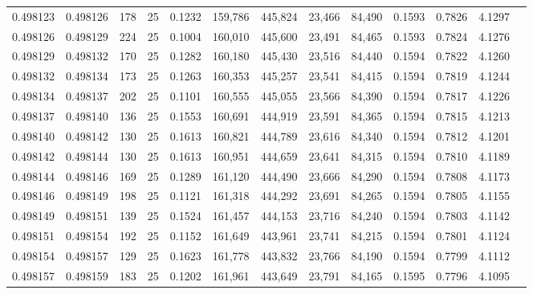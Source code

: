 \begin{tabular}{rrrrrrrrrrrrr}
0.498123 & 0.498126 & 178 &  25 &                                     0.1232 & 159,786 & 445,824 &  23,466 &  84,490 & 0.1593 & 0.7826 & 4.1297 \\
0.498126 & 0.498129 & 224 &  25 &                                     0.1004 & 160,010 & 445,600 &  23,491 &  84,465 & 0.1593 & 0.7824 & 4.1276 \\
0.498129 & 0.498132 & 170 &  25 &                                     0.1282 & 160,180 & 445,430 &  23,516 &  84,440 & 0.1594 & 0.7822 & 4.1260 \\
0.498132 & 0.498134 & 173 &  25 &                                     0.1263 & 160,353 & 445,257 &  23,541 &  84,415 & 0.1594 & 0.7819 & 4.1244 \\
0.498134 & 0.498137 & 202 &  25 &                                     0.1101 & 160,555 & 445,055 &  23,566 &  84,390 & 0.1594 & 0.7817 & 4.1226 \\
0.498137 & 0.498140 & 136 &  25 &                                     0.1553 & 160,691 & 444,919 &  23,591 &  84,365 & 0.1594 & 0.7815 & 4.1213 \\
0.498140 & 0.498142 & 130 &  25 &                                     0.1613 & 160,821 & 444,789 &  23,616 &  84,340 & 0.1594 & 0.7812 & 4.1201 \\
0.498142 & 0.498144 & 130 &  25 &                                     0.1613 & 160,951 & 444,659 &  23,641 &  84,315 & 0.1594 & 0.7810 & 4.1189 \\
0.498144 & 0.498146 & 169 &  25 &                                     0.1289 & 161,120 & 444,490 &  23,666 &  84,290 & 0.1594 & 0.7808 & 4.1173 \\
0.498146 & 0.498149 & 198 &  25 &                                     0.1121 & 161,318 & 444,292 &  23,691 &  84,265 & 0.1594 & 0.7805 & 4.1155 \\
0.498149 & 0.498151 & 139 &  25 &                                     0.1524 & 161,457 & 444,153 &  23,716 &  84,240 & 0.1594 & 0.7803 & 4.1142 \\
0.498151 & 0.498154 & 192 &  25 &                                     0.1152 & 161,649 & 443,961 &  23,741 &  84,215 & 0.1594 & 0.7801 & 4.1124 \\
0.498154 & 0.498157 & 129 &  25 &                                     0.1623 & 161,778 & 443,832 &  23,766 &  84,190 & 0.1594 & 0.7799 & 4.1112 \\
0.498157 & 0.498159 & 183 &  25 &                                     0.1202 & 161,961 & 443,649 &  23,791 &  84,165 & 0.1595 & 0.7796 & 4.1095 \\

\end{tabular}
